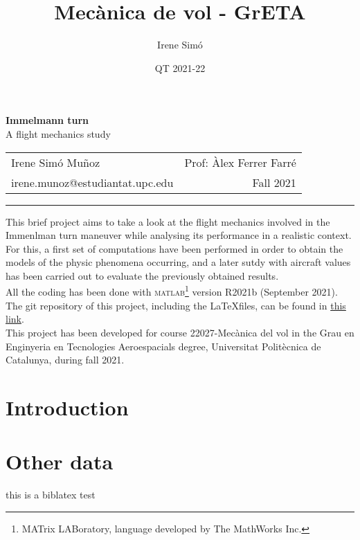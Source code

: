\documentclass[10pt, twoside]{report}
\title{Mecànica de vol - GrETA}
\author{Irene Simó}
\date{QT 2021-22}
\begin{document}
\thispagestyle{empty} 
	\begin{center}
	\LARGE \textbf{Immelmann turn}\\
	\Large A flight mechanics study\\
		\normalsize
	\begin{tabularx}{\textwidth}{l r}
		Irene Simó Muñoz & Prof: Àlex Ferrer Farré\\
		irene.munoz@estudiantat.upc.edu & Fall 2021
	\end{tabularx}

	\hrule
	\end{center}
	This brief project aims to take a look at the flight mechanics involved in the Immenlman turn maneuver while analysing its performance in a realistic context. \\ For this, a first set of computations have been performed in order to obtain the models of the physic phenomena occurring, and a later sutdy with aircraft values has been carried out to evaluate the previously obtained results.\\
	All the coding has been done with \textsc{matlab}\footnote{MATrix LABoratory, language developed by The MathWorks Inc.} version R2021b (September 2021). The git repository of this project, including the \LaTeX files, can be found in \hyperlink{https://github.com/isimo00/immelmann-turn}{this link}.\\
	This project has been developed for course 22027-Mecànica del vol in the Grau en Enginyeria en Tecnologies Aeroespacials degree, Universitat Politècnica de Catalunya, during fall 2021.
	
	\begin{multicols}{2}
	\vspace*{-2cm}
	\tableofcontents
	\section*{Introduction}
	
		
	

	
	\section*{Other data}
	this is a biblatex test \cite{tierno}
	\end{multicols}\clearpage

\listoffigures
\listoftables\clearpage
\appendix

\end{document}
